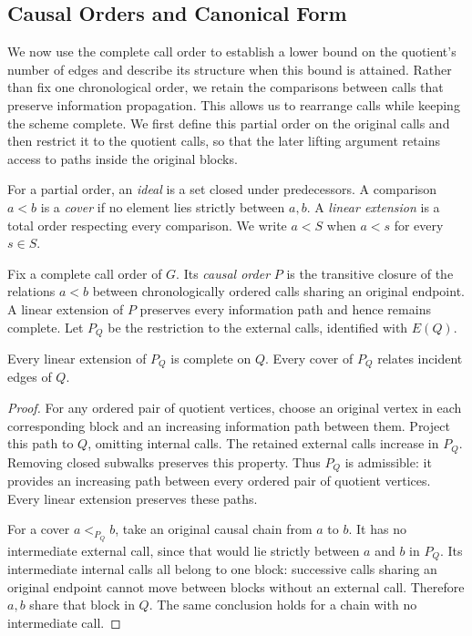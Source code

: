 \documentclass[USenglish, a4paper, thm-restate,numberwithinsect, cleveref]{lipics-v2021}
\begin{document}
\subsection{Causal Orders and Canonical Form}
\label{sec:necessity-canonical}
We now use the complete call order to establish a lower bound on the
quotient's number of edges and describe its structure when this bound
is attained. Rather than fix one chronological order, we retain the
comparisons between calls that preserve information propagation.
This allows us to rearrange calls while keeping the scheme complete.
We first define this partial order on the original calls and then
restrict it to the quotient calls, so that the later lifting argument
retains access to paths inside the original blocks.

For a partial order, an \emph{ideal} is a set closed under
predecessors. A comparison $a<b$ is a \emph{cover} if no element lies
strictly between $a,b$. A \emph{linear extension} is a total order
respecting every comparison. We write $a<S$ when $a<s$ for every
$s\in S$.

Fix a complete call order of $G$. Its \emph{causal order} $P$ is the
transitive closure of the relations $a<b$ between chronologically
ordered calls sharing an original endpoint. A linear extension of $P$
preserves every information path and hence remains complete. Let $P_Q$
be the restriction to the external calls, identified with $E(Q)$.

\begin{lemma}\label{lem:characterization-poset-transfer}
Every linear extension of $P_Q$ is complete on $Q$.
Every cover of $P_Q$ relates incident edges of $Q$.
\end{lemma}
\begin{proof}
For any ordered pair of quotient vertices, choose an original vertex
in each corresponding block and an increasing information path
between them. Project this path to $Q$, omitting internal calls.
The retained external calls increase in $P_Q$.
Removing closed subwalks preserves this property. Thus $P_Q$ is
admissible: it provides an increasing path between every ordered pair
of quotient vertices. Every linear extension preserves these paths.

For a cover $a<_{P_Q}b$, take an original causal chain from $a$ to
$b$. It has no intermediate external call, since that would lie
strictly between $a$ and $b$ in $P_Q$. Its intermediate internal calls
all belong to one block: successive calls sharing an original endpoint
cannot move between blocks without an external call. Therefore $a,b$
share that block in $Q$. The same conclusion holds for a chain with
no intermediate call.
\end{proof}
\end{document}
